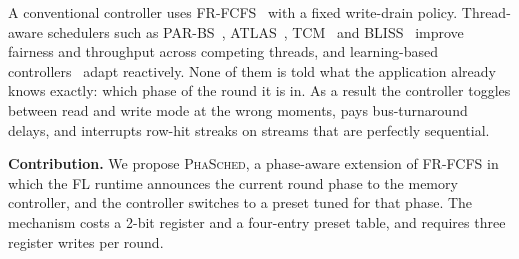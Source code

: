 \documentclass[conference]{IEEEtran}
\newcommand{\name}{\textsc{PhaSched}}
\begin{document}
A conventional controller uses FR-FCFS~\cite{frfcfs} with a fixed write-drain policy. Thread-aware schedulers such as PAR-BS~\cite{parbs}, ATLAS~\cite{atlas}, TCM~\cite{tcm} and BLISS~\cite{bliss} improve fairness and throughput across competing threads, and learning-based controllers~\cite{rlsched} adapt reactively. None of them is told what the application already knows exactly: which phase of the round it is in. As a result the controller toggles between read and write mode at the wrong moments, pays bus-turnaround delays, and interrupts row-hit streaks on streams that are perfectly sequential.

\textbf{Contribution.} We propose \name{}, a phase-aware extension of FR-FCFS in which the FL runtime announces the current round phase to the memory controller, and the controller switches to a preset tuned for that phase. The mechanism costs a 2-bit register and a four-entry preset table, and requires three register writes per round.
\end{document}
